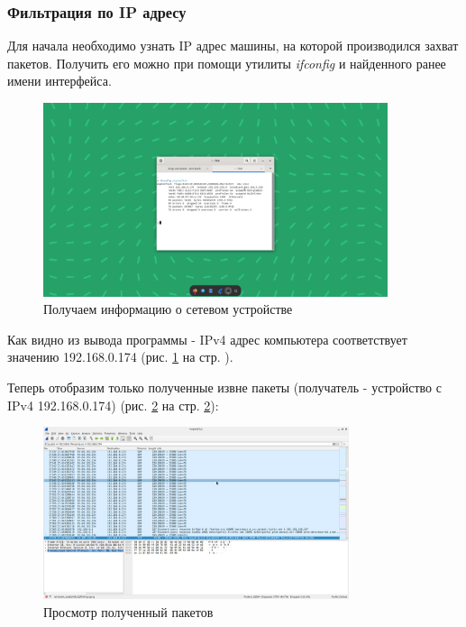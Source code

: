 \documentclass[a4paper]{article}
\begin{document}
  \subsubsection{Фильтрация по IP адресу}
  
  Для начала необходимо узнать IP адрес машины, на которой производился захват пакетов.
  Получить его можно при помощи утилиты \textit{ifconfig} и найденного ранее 
  имени интерфейса.

  \begin{figure}[H]
    \centering
    \includegraphics[width=0.9\textwidth]{02_0008}
    \caption{Получаем информацию о сетевом устройстве}
    \label{img:0008}
  \end{figure}

  Как видно из вывода программы - IPv4 адрес компьютера соответствует
  значению 192.168.0.174 (рис. \ref{img:0008} на стр. \pageref{img:0008}).

  Теперь отобразим только полученные извне пакеты (получатель - устройство с 
  IPv4 192.168.0.174) (рис. \ref{img:0009} на стр. \ref{img:0009}):

  \begin{figure}[H]
    \centering
    \includegraphics[width=0.8\textwidth]{02_0009}
    \caption{Просмотр полученный пакетов}
    \label{img:0009}
  \end{figure}
\end{document}
